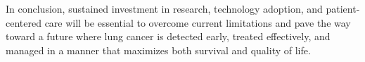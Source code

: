 In conclusion, sustained investment in research, technology adoption, and patient-centered care will 
be essential to overcome current limitations and pave the way toward a future where lung cancer is 
detected early, treated effectively, and managed in a manner that maximizes both survival and 
quality of life.
